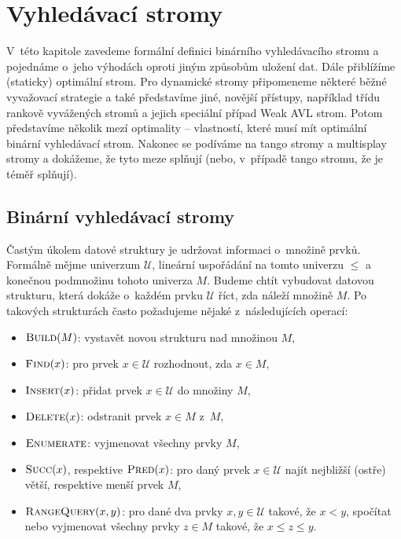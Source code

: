 \chapter{Vyhledávací stromy}

V~této kapitole zavedeme formální definici binárního vyhledávacího stromu a
pojednáme o~jeho výhodách oproti jiným způsobům uložení dat. Dále přiblížíme
(staticky) optimální strom. Pro dynamické stromy připomeneme některé běžné
vyvažovací strategie a také představíme jiné, novější přístupy, například třídu
rankově vyvážených stromů a jejich speciální případ Weak AVL strom. Potom
představíme několik mezí optimality -- vlastností, které musí mít optimální
binární vyhledávací strom. Nakonec se podíváme na tango stromy a multisplay
stromy a dokážeme, že tyto meze splňují (nebo, v~případě tango stromu, že je
téměř splňují).

\section{Binární vyhledávací stromy}
\def\U{\mathcal U}
\def\o{\mathcal O}
\let\op\operatorname

Častým úkolem datové struktury je udržovat informaci o~množině prvků. Formálně
mějme univerzum $\mathcal U$, lineární uspořádání na tomto univerzu $\leq$ a
konečnou podmnožinu tohoto univerza $M$. Budeme chtít vybudovat datovou strukturu, která dokáže
o~každém prvku $\mathcal U$ říct, zda náleží množině $M$. Po takových
strukturách často požadujeme nějaké z~následujících operací:

\begin{itemize}
\item $\ope{Build}(M)$: vystavět novou strukturu nad množinou $M$,
\item $\ope{Find}(x)$: pro prvek $x \in \U$ rozhodnout, zda $x\in M$,
\item $\ope{Insert}(x)$: přidat prvek $x \in \U$ do množiny $M$,
\item $\ope{Delete}(x)$: odstranit prvek $x\in M$ z~$M$,
\item $\ope{Enumerate}$: vyjmenovat všechny prvky $M$,
\item $\ope{Succ}(x)$, respektive $\ope{Pred}(x)$: pro daný prvek $x\in \U $ najít nejbližší (ostře) větší, respektive menší prvek $M$,
\item $\ope{RangeQuery}(x,y)$: pro dané dva prvky $x,y\in\U$ takové, že $x<y$, spočítat nebo vyjmenovat všechny prvky $z\in M$ takové, že $x \leq z \leq y$.
\end{itemize}


